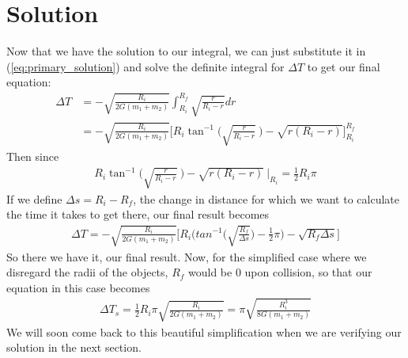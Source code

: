 \documentclass{article}
\begin{document}
\section{Solution}
Now that we have the solution to our integral, we can just substitute it in (\ref{eq:primary_solution}) and solve the definite integral for $\Delta T$ to get our final equation:
\begin{align}
\Delta T &=  - \sqrt{\frac{R_i}{2G(m_1 + m_2)}} \int_{R_i}^{R_f} \sqrt{\frac{r}{R_i - r}} dr\\
&=   - \sqrt{\frac{R_i}{2G(m_1 + m_2)}} \biggl[  R_i \tan^{-1}\biggl(\sqrt{\frac{r}{R_i - r}} ~ \biggr) -\sqrt{r( R_i - r)} \biggr]_{R_i}^{R_f}
\end{align}
Then since
\begin{align}
     R_i \tan^{-1}\biggl(\sqrt{\frac{r}{R_i - r}} ~ \biggr) -\sqrt{r( R_i - r)} ~ \bigg|_{R_i} = \frac{1}{2} R_i \pi
\end{align}
If we define $\Delta s = R_i - R_f$, the change in distance for which we want to calculate the time it takes to get there, our final result becomes
\begin{align}
    \Delta T =  - \sqrt{\frac{R_i}{2G(m_1 + m_2)}} \biggl[ R_i \biggl( tan^{-1}\biggl(\sqrt{\frac{R_f}{ \Delta s}}\biggr) - \frac{1}{2}\pi \biggr) - \sqrt{R_f \Delta s } \biggr]
\end{align}
So there we have it, our final result. Now, for the simplified case where we disregard the radii of the objects, $R_f$ would be $0$ upon collision, so that our equation in this case becomes
\begin{align}
    \label{eq:simplified_kepler}
    \Delta T_{s} =  \frac{1}{2} R_i \pi \sqrt{\frac{R_i}{2G(m_1 + m_2)}} = \pi \sqrt{\frac{R_i^3}{8G(m_1 + m_2)}}
\end{align}
We will soon come back to this beautiful simplification when we are verifying our solution in the next section.
\end{document}
